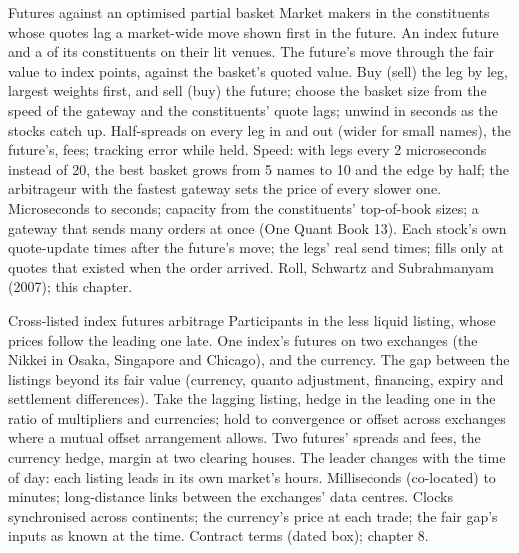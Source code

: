 \begin{strategyfile}{Futures against an optimised partial basket}\label{strat:hf:index-and-basket-arbitrage:partial}
 Market makers in the constituents whose quotes lag a market-wide move shown first in the future.
 An index future and a  of its constituents on their lit venues.
 The future's move through the fair value to index points, against the basket's quoted value.
 Buy (sell) the  leg by leg, largest weights first, and sell (buy) the future; choose the basket size
from the speed of the gateway and the constituents' quote lags; unwind in seconds as the stocks catch up.
 Half-spreads on every leg in and out (wider for small names), the future's, fees; tracking error while held.
 Speed: with legs every 2 microseconds instead of 20, the best basket grows from 5 names to 10 and the edge by half; the
arbitrageur with the fastest gateway sets the price of every slower one.
 Microseconds to seconds; capacity from the constituents' top-of-book sizes; a gateway that sends many
orders at once (One Quant Book 13).
 Each stock's own quote-update times after the future's move; the legs' real send times; fills only at quotes that
existed when the order arrived.
 Roll, Schwartz and Subrahmanyam (2007); this chapter.
\end{strategyfile}

\begin{strategyfile}{Cross-listed index futures arbitrage}\label{strat:hf:index-and-basket-arbitrage:cross}
 Participants in the less liquid listing, whose prices follow the leading one late.
 One index's futures on two exchanges (the Nikkei in Osaka, Singapore and Chicago), and the currency.
 The gap between the listings beyond its fair value (currency, quanto adjustment, financing, expiry and settlement differences).
 Take the lagging listing, hedge in the leading one in the ratio of multipliers and currencies; hold to convergence or
offset across exchanges where a mutual offset arrangement allows.
 Two futures' spreads and fees, the currency hedge, margin at two clearing houses.
 The leader changes with the time of day: each listing leads in its own market's hours.
 Milliseconds (co-located) to minutes; long-distance links between the exchanges' data centres.
 Clocks synchronised across continents; the currency's price at each trade; the fair gap's inputs as known at the time.
 Contract terms (dated box); chapter 8.
\end{strategyfile}

